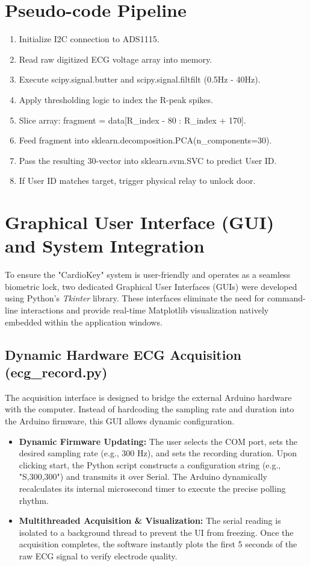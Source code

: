 \documentclass[12pt,a4paper]{report}
\begin{document}
\section{Pseudo-code Pipeline}
\begin{enumerate}
\item Initialize I2C connection to ADS1115.
\item Read raw digitized ECG voltage array into memory.
\item Execute scipy.signal.butter and scipy.signal.filtfilt (0.5Hz - 40Hz).
\item Apply thresholding logic to index the R-peak spikes.
\item Slice array: fragment = data[R\_index - 80 : R\_index + 170].
\item Feed fragment into sklearn.decomposition.PCA(n\_components=30).
\item Pass the resulting 30-vector into sklearn.svm.SVC to predict User ID.
\item If User ID matches target, trigger physical relay to unlock door.
\end{enumerate}

\section{Graphical User Interface (GUI) and System Integration}
To ensure the "CardioKey" system is user-friendly and operates as a seamless biometric lock, two dedicated Graphical User Interfaces (GUIs) were developed using Python's \textit{Tkinter} library. These interfaces eliminate the need for command-line interactions and provide real-time Matplotlib visualization natively embedded within the application windows.

\subsection{Dynamic Hardware ECG Acquisition (ecg\_record.py)}
The acquisition interface is designed to bridge the external Arduino hardware with the computer. Instead of hardcoding the sampling rate and duration into the Arduino firmware, this GUI allows dynamic configuration. 
\begin{itemize}
    \item \textbf{Dynamic Firmware Updating:} The user selects the COM port, sets the desired sampling rate (e.g., 300 Hz), and sets the recording duration. Upon clicking start, the Python script constructs a configuration string (e.g., "S,300,300") and transmits it over Serial. The Arduino dynamically recalculates its internal microsecond timer to execute the precise polling rhythm.
    \item \textbf{Multithreaded Acquisition \& Visualization:} The serial reading is isolated to a background thread to prevent the UI from freezing. Once the acquisition completes, the software instantly plots the first 5 seconds of the raw ECG signal to verify electrode quality.
\end{itemize}
\end{document}

